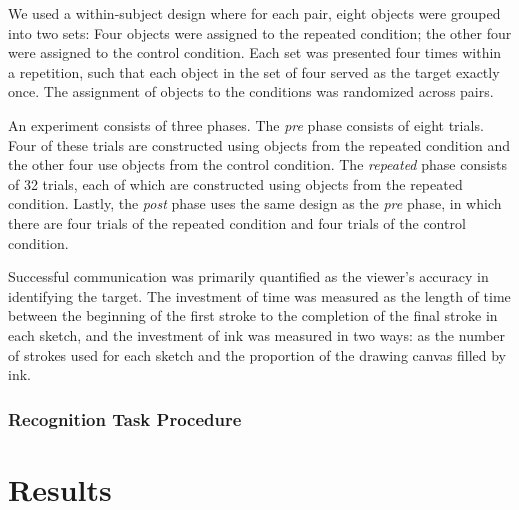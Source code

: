 \documentclass[10pt,letterpaper]{article}
\begin{document}
We used a within-subject design where for each pair, eight objects were grouped into two sets: Four objects were assigned to the repeated condition; the other four were assigned to the control condition. Each set was presented four times within a repetition, such that each object in the set of four served as the target exactly once. The assignment of objects to the conditions was randomized across pairs. 

An experiment consists of three phases. The \textit{pre} phase consists of eight trials. Four of these trials are constructed using objects from the repeated condition and the other four use objects from the control condition. The \textit{repeated} phase consists of 32 trials, each of which are constructed using objects from the repeated condition. Lastly, the \textit{post} phase uses the same design as the \textit{pre} phase, in which there are four trials of the repeated condition and four trials of the control condition. 

Successful communication was primarily quantified as the viewer's accuracy in identifying the target. The investment of time was measured as the length of time between the beginning of the first stroke to the completion of the final stroke in each sketch, and the investment of ink was measured in two ways: as the number of strokes used for each sketch and the proportion of the drawing canvas filled by ink.


\subsubsection{Recognition Task Procedure}

\section{Results}
\end{document}
